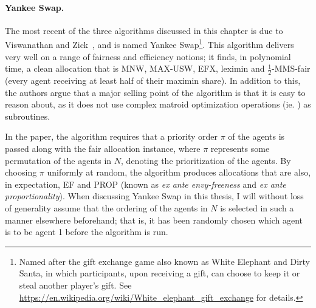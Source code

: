 \paragraph{Yankee Swap.} The most recent of the three algorithms discussed in this chapter is due to Viswanathan and Zick~\cite{viswanathan2023yankee}, and is named Yankee Swap\footnote{Named after the gift exchange game also known as White Elephant and Dirty Santa, in which participants, upon receiving a gift, can choose to keep it or steal another player's gift. See \href{https://en.wikipedia.org/wiki/White_elephant_gift_exchange}{https://en.wikipedia.org/wiki/White\_elephant\_gift\_exchange} for details.}. This algorithm delivers very well on a range of fairness and efficiency notions; it finds, in polynomial time, a clean allocation that is MNW, MAX-USW, EFX, leximin and $\frac{1}{2}$-MMS-fair (every agent receiving at least half of their maximin share). In addition to this, the authors argue that a major selling point of the algorithm is that it is easy to reason about, as it does not use complex matroid optimization operations (ie. ) as subroutines.

In the paper, the algorithm requires that a priority order $\pi$ of the agents is passed along with the fair allocation instance, where $\pi$ represents some permutation of the agents in $N$, denoting the prioritization of the agents. By choosing $\pi$ uniformly at random, the algorithm produces allocations that are also, in expectation, EF and PROP (known as \textit{ex ante envy-freeness} and \textit{ex ante proportionality}). When discussing Yankee Swap in this thesis, I will without loss of generality assume that the ordering of the agents in $N$ is selected in such a manner elsewhere beforehand; that is, it has been randomly chosen which agent is to be agent 1 before the algorithm is run.

